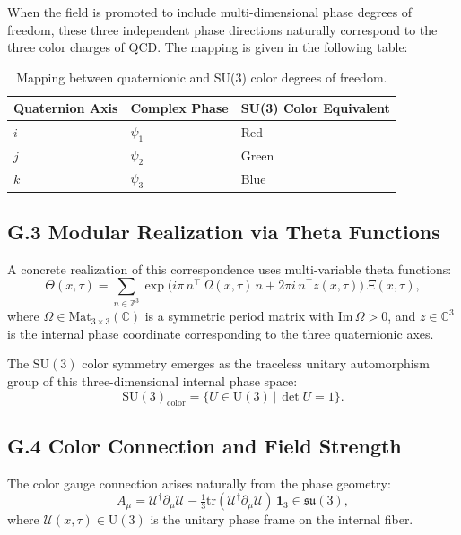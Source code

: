 When the field is promoted to include multi-dimensional phase degrees of freedom, these three independent phase directions naturally correspond to the three color charges of QCD. The mapping is given in the following table:

\begin{table}[h]
\centering
\caption{Mapping between quaternionic and SU(3) color degrees of freedom.}
\begin{tabular}{lll}
\hline
Quaternion Axis & Complex Phase & SU(3) Color Equivalent \\
\hline
$i$ & $\psi_1$ & Red \\
$j$ & $\psi_2$ & Green \\
$k$ & $\psi_3$ & Blue \\
\hline
\end{tabular}
\label{tab:quaternion_color_map}
\end{table}

\subsection*{G.3 Modular Realization via Theta Functions}

A concrete realization of this correspondence uses multi-variable theta functions:
\begin{equation}
\Theta(x,\tau) = \sum_{n\in \mathbb{Z}^3}\exp\Big(i\pi\, n^{\!\top}\,\Omega(x,\tau)\,n + 2\pi i\, n^{\!\top} z(x,\tau)\Big)\, \Xi(x,\tau),
\end{equation}
where $\Omega\in \mathrm{Mat}_{3\times 3}(\mathbb{C})$ is a symmetric period matrix with $\mathrm{Im}\,\Omega>0$, and $z\in \mathbb{C}^3$ is the internal phase coordinate corresponding to the three quaternionic axes.

The $\mathrm{SU}(3)$ color symmetry emerges as the traceless unitary automorphism group of this three-dimensional internal phase space:
\begin{equation}
\mathrm{SU}(3)_{\text{color}} = \{U\in \mathrm{U}(3)\,|\,\det U=1\}.
\end{equation}

\subsection*{G.4 Color Connection and Field Strength}

The color gauge connection arises naturally from the phase geometry:
\begin{equation}
A_\mu = \mathcal{U}^\dagger \partial_\mu \mathcal{U} - \tfrac{1}{3}\mathrm{tr}(\mathcal{U}^\dagger \partial_\mu \mathcal{U})\,\mathbf{1}_3 \in \mathfrak{su}(3),
\end{equation}
where $\mathcal{U}(x,\tau) \in \mathrm{U}(3)$ is the unitary phase frame on the internal fiber.

